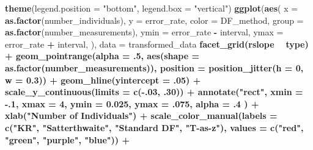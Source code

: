 \documentclass[12pt, twoside]{amherstthesis}
\newenvironment{Shaded}{\begin{snugshade}}{\end{snugshade}}
\newcommand{\DataTypeTok}[1]{\textcolor[rgb]{0.13,0.29,0.53}{#1}}
\newcommand{\DecValTok}[1]{\textcolor[rgb]{0.00,0.00,0.81}{#1}}
\newcommand{\FloatTok}[1]{\textcolor[rgb]{0.00,0.00,0.81}{#1}}
\newcommand{\KeywordTok}[1]{\textcolor[rgb]{0.13,0.29,0.53}{\textbf{#1}}}
\newcommand{\NormalTok}[1]{#1}
\newcommand{\OperatorTok}[1]{\textcolor[rgb]{0.81,0.36,0.00}{\textbf{#1}}}
\newcommand{\StringTok}[1]{\textcolor[rgb]{0.31,0.60,0.02}{#1}}
\begin{document}
\begin{Shaded}
\begin{Highlighting}[]
{{{{{{{{{{{{\StringTok{  }\KeywordTok{theme}\NormalTok{(}\DataTypeTok{legend.position =} \StringTok{"bottom"}\NormalTok{, }\DataTypeTok{legend.box =} \StringTok{"vertical"}\NormalTok{)}
\KeywordTok{ggplot}\NormalTok{(}\KeywordTok{aes}\NormalTok{(}
  \DataTypeTok{x =} \KeywordTok{as.factor}\NormalTok{(number_individuals), }\DataTypeTok{y =}\NormalTok{ error_rate, }\DataTypeTok{color =}\NormalTok{ DF_method,}
  \DataTypeTok{group =} \KeywordTok{as.factor}\NormalTok{(number_measurements), }\DataTypeTok{ymin =}\NormalTok{ error_rate }\OperatorTok{-}\StringTok{ }\NormalTok{interval, }
  \DataTypeTok{ymax =}\NormalTok{ error_rate }\OperatorTok{+}\StringTok{ }\NormalTok{interval,}
\NormalTok{), }\DataTypeTok{data =}\NormalTok{ transformed_data }\OperatorTok{%>%}\StringTok{ }\KeywordTok{filter}\NormalTok{(distribution }\OperatorTok{==}\StringTok{ "Gaussian"}\NormalTok{)) }\OperatorTok{+}
\StringTok{  }\KeywordTok{facet_grid}\NormalTok{(rslope }\OperatorTok{~}\StringTok{ }\NormalTok{type) }\OperatorTok{+}
\StringTok{  }\KeywordTok{geom_pointrange}\NormalTok{(}\DataTypeTok{alpha =} \FloatTok{.5}\NormalTok{, }\KeywordTok{aes}\NormalTok{(}\DataTypeTok{shape =} \KeywordTok{as.factor}\NormalTok{(number_measurements)), }
                  \DataTypeTok{position =} \KeywordTok{position_jitter}\NormalTok{(}\DataTypeTok{h =} \DecValTok{0}\NormalTok{, }\DataTypeTok{w =} \FloatTok{0.3}\NormalTok{)) }\OperatorTok{+}
\StringTok{  }\KeywordTok{geom_hline}\NormalTok{(}\DataTypeTok{yintercept =} \FloatTok{.05}\NormalTok{) }\OperatorTok{+}
\StringTok{  }\KeywordTok{scale_y_continuous}\NormalTok{(}\DataTypeTok{limits =} \KeywordTok{c}\NormalTok{(}\OperatorTok{-}\NormalTok{.}\DecValTok{03}\NormalTok{, }\FloatTok{.30}\NormalTok{)) }\OperatorTok{+}
\StringTok{  }\KeywordTok{annotate}\NormalTok{(}\StringTok{"rect"}\NormalTok{,}
    \DataTypeTok{xmin =} \FloatTok{-.1}\NormalTok{, }\DataTypeTok{xmax =} \DecValTok{4}\NormalTok{, }\DataTypeTok{ymin =} \FloatTok{0.025}\NormalTok{, }\DataTypeTok{ymax =} \FloatTok{.075}\NormalTok{,}
    \DataTypeTok{alpha =} \FloatTok{.4}
\NormalTok{  ) }\OperatorTok{+}
\StringTok{  }\KeywordTok{xlab}\NormalTok{(}\StringTok{"Number of Individuals"}\NormalTok{) }\OperatorTok{+}
\StringTok{  }\KeywordTok{scale_color_manual}\NormalTok{(}\DataTypeTok{labels =} \KeywordTok{c}\NormalTok{(}\StringTok{"KR"}\NormalTok{, }\StringTok{"Satterthwaite"}\NormalTok{, }\StringTok{"Standard DF"}\NormalTok{, }\StringTok{"T-as-z"}\NormalTok{), }
                     \DataTypeTok{values =} \KeywordTok{c}\NormalTok{(}\StringTok{"red"}\NormalTok{, }\StringTok{"green"}\NormalTok{, }\StringTok{"purple"}\NormalTok{, }\StringTok{"blue"}\NormalTok{)) }\OperatorTok{+}
}}}}}}}}}}}}}
\end{Highlighting}
\end{Shaded}
\end{document}
